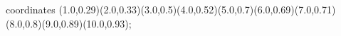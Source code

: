 					coordinates { (1.0,0.29)(2.0,0.33)(3.0,0.5)(4.0,0.52)(5.0,0.7)(6.0,0.69)(7.0,0.71)(8.0,0.8)(9.0,0.89)(10.0,0.93)};